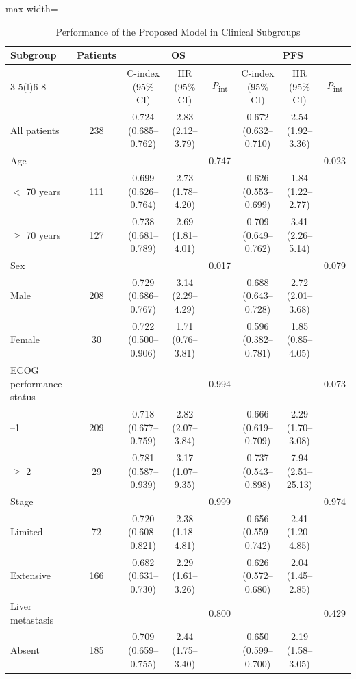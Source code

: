 \documentclass{article}
\begin{document}
\begin{table}[htbp]
\centering
\setlength{\belowcaptionskip}{4pt}
\caption{Performance of the Proposed Model in Clinical Subgroups}
\label{tab:subgroups}
\footnotesize\setlength{\tabcolsep}{2.5pt}
\begin{adjustbox}{max width=\textwidth}
\begin{tabular}{@{}lc ccc ccc@{}}
\toprule
Subgroup & Patients & \multicolumn{3}{c}{OS} & \multicolumn{3}{c}{PFS} \\
\cmidrule(lr){3-5}\cmidrule(l){6-8}
 & & C-index (95\% CI) & HR (95\% CI) & \textit{P}\textsubscript{int} & C-index (95\% CI) & HR (95\% CI) & \textit{P}\textsubscript{int} \\
\midrule
All patients & 238 & 0.724 (0.685--0.762) & 2.83 (2.12--3.79) & & 0.672 (0.632--0.710) & 2.54 (1.92--3.36) & \\
\addlinespace
Age & & & & 0.747 & & & 0.023 \\
\quad $<$ 70 years & 111 & 0.699 (0.626--0.764) & 2.73 (1.78--4.20) & & 0.626 (0.553--0.699) & 1.84 (1.22--2.77) & \\
\quad $\geq$ 70 years & 127 & 0.738 (0.681--0.789) & 2.69 (1.81--4.01) & & 0.709 (0.649--0.762) & 3.41 (2.26--5.14) & \\
Sex & & & & 0.017 & & & 0.079 \\
\quad Male & 208 & 0.729 (0.686--0.767) & 3.14 (2.29--4.29) & & 0.688 (0.643--0.728) & 2.72 (2.01--3.68) & \\
\quad Female & 30 & 0.722 (0.500--0.906) & 1.71 (0.76--3.81) & & 0.596 (0.382--0.781) & 1.85 (0.85--4.05) & \\
ECOG performance status & & & & 0.994 & & & 0.073 \\
\quad 0--1 & 209 & 0.718 (0.677--0.759) & 2.82 (2.07--3.84) & & 0.666 (0.619--0.709) & 2.29 (1.70--3.08) & \\
\quad $\geq$ 2 & 29 & 0.781 (0.587--0.939) & 3.17 (1.07--9.35) & & 0.737 (0.543--0.898) & 7.94 (2.51--25.13) & \\
Stage & & & & 0.999 & & & 0.974 \\
\quad Limited & 72 & 0.720 (0.608--0.821) & 2.38 (1.18--4.81) & & 0.656 (0.559--0.742) & 2.41 (1.20--4.85) & \\
\quad Extensive & 166 & 0.682 (0.631--0.730) & 2.29 (1.61--3.26) & & 0.626 (0.572--0.680) & 2.04 (1.45--2.85) & \\
Liver metastasis & & & & 0.800 & & & 0.429 \\
\quad Absent & 185 & 0.709 (0.659--0.755) & 2.44 (1.75--3.40) & & 0.650 (0.599--0.700) & 2.19 (1.58--3.05) & \\

\end{tabular}
\end{adjustbox}
\end{table}
\end{document}
